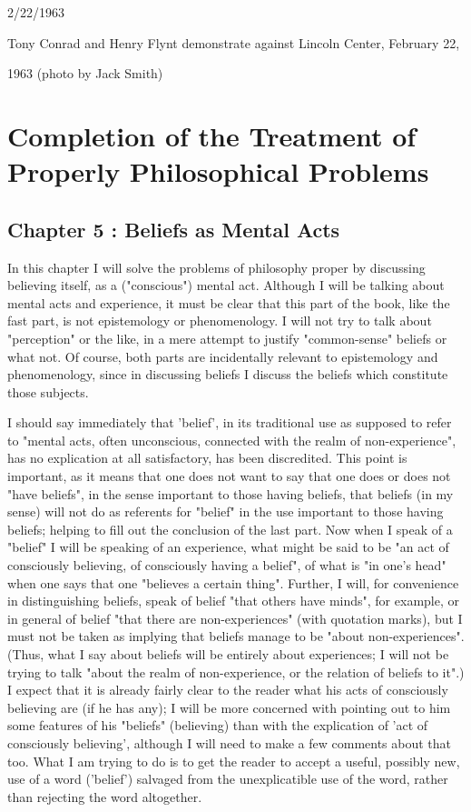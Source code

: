 \documentclass[10pt,twoside,draft]{memoir}
\begin{document}
{\clearpage


2/22/1963 


Tony Conrad and Henry Flynt demonstrate 
against Lincoln Center, February 22, 


1963 
(photo by Jack Smith)

\clearpage


\section{Completion of the Treatment of Properly Philosophical Problems}


\subsection*{Chapter 5 : Beliefs as Mental Acts}


In this chapter I will solve the problems of philosophy proper by 
discussing believing itself, as a ("conscious") mental act. Although I will be 
talking about mental acts and experience, it must be clear that this part of 
the book, like the fast part, is not epistemology or phenomenology. I will 
not try to talk about "perception" or the like, in a mere attempt to justify 
"common-sense" beliefs or what not. Of course, both parts are incidentally 
relevant to epistemology and phenomenology, since in discussing beliefs I 
discuss the beliefs which constitute those subjects. 

I should say immediately that 'belief', in its traditional use as supposed 
to refer to "mental acts, often unconscious, connected with the realm of 
non-experience", has no explication at all satisfactory, has been discredited. 
This point is important, as it means that one does not want to say that one 
does or does not "have beliefs", in the sense important to those having 
beliefs, that beliefs (in my sense) will not do as referents for "belief" in the 
use important to those having beliefs; helping to fill out the conclusion of 
the last part. Now when I speak of a "belief" I will be speaking of an 
experience, what might be said to be "an act of consciously believing, of 
consciously having a belief", of what is "in one's head" when one says that 
one "believes a certain thing". Further, I will, for convenience in 
distinguishing beliefs, speak of belief "that others have minds", for example, 
or in general of belief "that there are non-experiences" (with quotation 
marks), but I must not be taken as implying that beliefs manage to be 
"about non-experiences". (Thus, what I say about beliefs will be entirely 
about experiences; I will not be trying to talk "about the realm of 
non-experience, or the relation of beliefs to it".) I expect that it is already 
fairly clear to the reader what his acts of consciously believing are (if he has 
any); I will be more concerned with pointing out to him some features of his 
"beliefs" (believing) than with the explication of 'act of consciously 
believing', although I will need to make a few comments about that too. 
What I am trying to do is to get the reader to accept a useful, possibly new, 
use of a word ('belief') salvaged from the unexplicatible use of the word, 
rather than rejecting the word altogether. 

}
\end{document}
